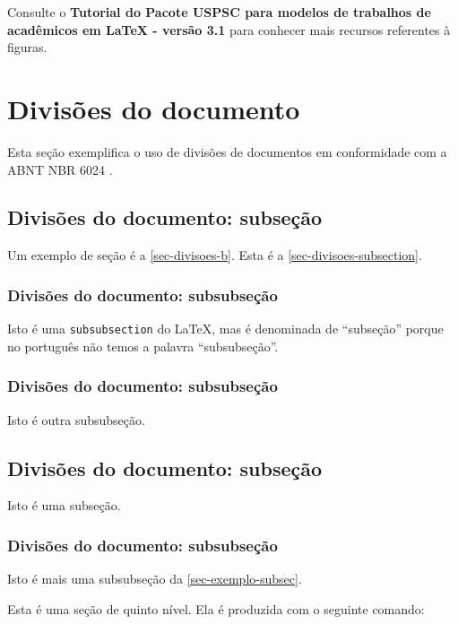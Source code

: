 Consulte o \textbf{Tutorial do Pacote USPSC para modelos de trabalhos de acad\^emicos em LaTeX - vers\~ao 3.1} para conhecer mais recursos referentes à figuras. 

\section{Divisões do documento}\label{sec-divisoes-b}
Esta seção exemplifica o uso de divisões de documentos em conformidade com a ABNT NBR 6024  \cite{nbr6024}.
\subsection{Divisões do documento: subseção}\label{sec-divisoes-subsection}

Um exemplo de seção é a \autoref{sec-divisoes-b}. Esta é a \autoref{sec-divisoes-subsection}.

\subsubsection{Divisões do documento: subsubseção}\label{sec-divisoes-subsubsection}

Isto é uma \texttt{subsubsection} do \LaTeX, mas é denominada de ``subseção'' porque no português não temos a palavra ``subsubseção''.

\subsubsection{Divisões do documento: subsubseção}

Isto é outra subsubseção.

\subsection{Divisões do documento: subseção}\label{sec-exemplo-subsec}

Isto é uma subseção.

\subsubsection{Divisões do documento: subsubseção}

Isto é mais uma subsubseção da \autoref{sec-exemplo-subsec}.


\label{sec-exemplo-subsubsubsection}

Esta é uma seção de quinto nível. Ela é produzida com o seguinte comando:

